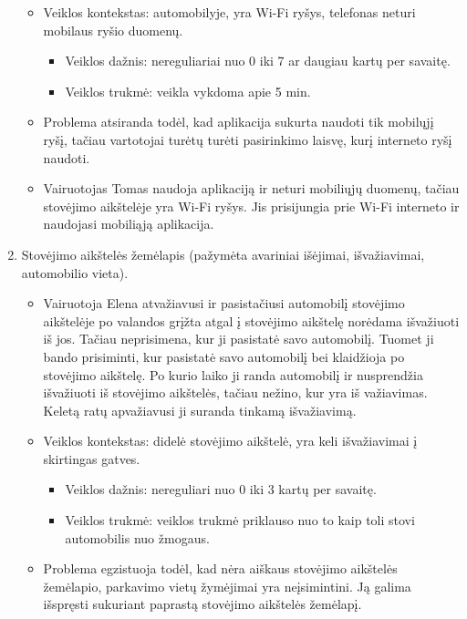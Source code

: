 \documentclass{VUMIFPSkursinis}
\begin{document}
\begin{enumerate}[label = \textbf{PV\arabic*.}]
\begin{itemize}[label={-}]
			\item Veiklos kontekstas: automobilyje, yra Wi-Fi ryšys, telefonas neturi mobilaus ryšio duomenų.
				\begin{itemize}[label={$\bullet$}]
					\item Veiklos dažnis: nereguliariai nuo 0 iki 7 ar daugiau kartų per savaitę.
					\item Veiklos trukmė:  veikla vykdoma apie 5 min.
				\end{itemize}
			\item Problema atsiranda todėl, kad aplikacija sukurta naudoti tik mobilųjį ryšį, tačiau vartotojai turėtų turėti pasirinkimo laisvę, kurį interneto ryšį naudoti.
			
			\item Vairuotojas Tomas naudoja aplikaciją ir neturi mobiliųjų duomenų, tačiau stovėjimo aikštelėje yra Wi-Fi ryšys. Jis prisijungia prie Wi-Fi interneto ir naudojasi mobiliąją aplikacija.
		\end{itemize}
	\item Stovėjimo aikštelės žemėlapis (pažymėta avariniai išėjimai, išvažiavimai, automobilio vieta).
		\begin{itemize}[label={-}]
			\item Vairuotoja Elena atvažiavusi ir pasistačiusi automobilį stovėjimo aikštelėje po valandos grįžta atgal į stovėjimo aikštelę norėdama išvažiuoti iš jos. Tačiau neprisimena, kur ji pasistatė savo automobilį. Tuomet ji bando prisiminti, kur pasistatė savo automobilį bei klaidžioja po stovėjimo aikštelę. Po kurio laiko ji randa automobilį ir nusprendžia išvažiuoti iš stovėjimo aikštelės, tačiau nežino, kur yra iš važiavimas. Keletą ratų apvažiavusi ji suranda tinkamą išvažiavimą.

			\item Veiklos kontekstas: didelė stovėjimo aikštelė, yra keli išvažiavimai į skirtingas gatves.
				\begin{itemize}[label={$\bullet$}]
					\item Veiklos dažnis: nereguliari nuo 0 iki 3 kartų per savaitę.
					\item Veiklos trukmė: veiklos trukmė priklauso nuo to kaip toli stovi automobilis nuo žmogaus.
				\end{itemize}
			\item Problema egzistuoja todėl, kad nėra aiškaus stovėjimo aikštelės žemėlapio, parkavimo vietų žymėjimai yra neįsimintini. Ją galima išspręsti sukuriant paprastą stovėjimo aikštelės žemėlapį.


\end{itemize}
\end{enumerate}
\end{document}
